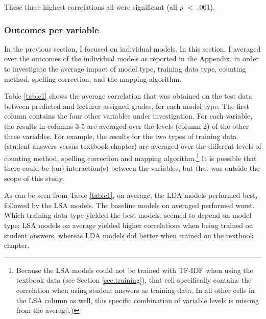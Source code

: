 \documentclass[a4paper,10pt,twoside]{article}
\begin{document}
These three highest correlations all were significant (all \textit{p} $<$ .001).

\subsubsection{Outcomes per variable}
In the previous section, I focused on individual models. In this section, I averaged over the outcomes of the individual models as reported in the Appendix, in order to investigate the average impact of model type, training data type, counting method, spelling correction, and the mapping algorithm. 

Table \ref{table1} shows the average correlation that was obtained on the test data between predicted and lecturer-assigned grades, for each model type. The first column contains the four other variables under investigation. For each variable, the results in columns 3-5 are averaged over the levels (column 2) of the other three variables. For example, the results for the two types of training data (student answers versus textbook chapter) are averaged over the different levels of counting method, spelling correction and mapping algorithm.\footnote{Because the LSA models could not be trained with TF-IDF when using the textbook data (see Section \ref{sec:training}), that cell specifically contains the correlation when using student answers as training data. In all other cells in the LSA column as well, this specific combination of variable levels is missing from the average.) } It is possible that there could be (an) interaction(s) between the variables, but that was outside the scope of this study.

As can be seen from Table \ref{table1}, on average, the LDA models performed best, followed by the LSA models. The baseline models on averaged performed worst. Which training data type yielded the best models, seemed to depend on model type: LSA models on average yielded higher correlations when being trained on student answers, whereas LDA models did better when trained on the textbook chapter.
\end{document}
